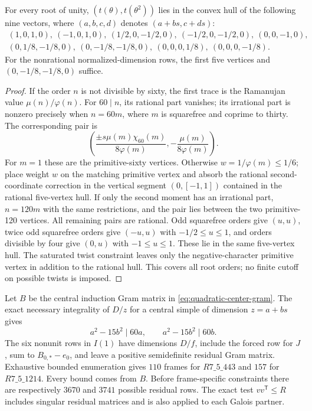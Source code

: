 \begin{lemma}\label{lem:m5-q60-hull}
For every root of unity, $(t(\theta),t(\theta^2))$ lies in the convex
hull of the following nine vectors, where $(a,b,c,d)$ denotes
$(a+bs,c+ds)$:
\begin{gather*}
 (1,0,1,0),\ (-1,0,1,0),\
 (1/2,0,-1/2,0),\ (-1/2,0,-1/2,0),\ (0,0,-1,0),\\
 (0,1/8,-1/8,0),\ (0,-1/8,-1/8,0),\
 (0,0,0,1/8),\ (0,0,0,-1/8).
\end{gather*}
For the nonrational normalized-dimension rows, the first five vertices
and $(0,-1/8,-1/8,0)$ suffice.
\end{lemma}
\begin{proof}
If the order $n$ is not divisible by sixty, the first trace is the
Ramanujan value $\mu(n)/\varphi(n)$.  For $60\mid n$, its rational
part vanishes; its irrational part is nonzero precisely when $n=60m$,
where $m$ is squarefree and coprime to thirty.  The corresponding pair is
\[
 \left(\frac{\pm s\mu(m)\chi_{60}(m)}{8\varphi(m)},
             -\frac{\mu(m)}{8\varphi(m)}\right).
\]
For $m=1$ these are the primitive-sixty vertices.  Otherwise
$w=1/\varphi(m)\leq1/6$; place weight $w$ on the matching primitive
vertex and absorb the rational second-coordinate correction in the
vertical segment $(0,[-1,1])$ contained in the rational five-vertex hull.
If only the second moment has an irrational part, $n=120m$ with the
same restrictions, and the pair lies between the two primitive-120
vertices.  All remaining pairs are rational.  Odd squarefree orders
give $(u,u)$, twice odd squarefree orders give $(-u,u)$ with
$-1/2\leq u\leq1$, and orders divisible by four give $(0,u)$ with
$-1\leq u\leq1$.  These lie in the same five-vertex hull.  The
saturated twist constraint leaves only the negative-character primitive
vertex in addition to the rational hull.  This covers all root orders;
no finite cutoff on possible twists is imposed.
\end{proof}

Let $B$ be the central induction Gram matrix in
\eqref{eq:quadratic-center-gram}.  The exact necessary integrality of
$D/z$ for a central simple of dimension $z=a+bs$ gives
\[
                  a^2-15b^2\mid60a,\qquad
                  a^2-15b^2\mid60b.
\]
The six nonunit rows in $I(1)$ have dimensions $D/f$, include the forced
row for $J$, sum to $B_{0,*}-e_0$, and leave a positive semidefinite
residual Gram matrix.  Exhaustive bounded enumeration gives $110$ frames
for $R7\_5\_443$ and $157$ for $R7\_5\_1214$.  Every bound comes
from $B$.  Before frame-specific constraints there are respectively
$3670$ and $3741$ possible residual rows.  The exact test
$vv^{\mathsf T}\leq R$ includes singular residual matrices and is also
applied to each Galois partner.


